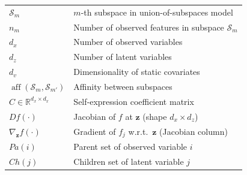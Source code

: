 \documentclass[11pt]{article}
\begin{document}
\begin{table}[htbp]
{\begin{tabular}{ll}
$\mathcal{S}_m$       & $m$-th subspace in union-of-subspaces model \\
$n_m$                 & Number of observed features in subspace $\mathcal{S}_m$ \\
$d_x$                 & Number of observed variables \\
$d_z$                 & Number of latent variables \\
$d_v$                 & Dimensionality of static covariates \\
$\operatorname{aff}(\mathcal{S}_m,\mathcal{S}_{m'})$ & Affinity between subspaces \\
$C \in \mathbb{R}^{d_x\times d_x}$ & Self‐expression coefficient matrix \\
$Df(\cdot)$           & Jacobian of $f$ at $\mathbf{z}$ (shape $d_x\times d_z$) \\
$\nabla_{\mathbf{z}} f(\cdot)$ & Gradient of $f_j$ w.r.t.\ $\mathbf{z}$ (Jacobian column) \\
$Pa(i)$               & Parent set of observed variable $i$ \\
$Ch(j)$               & Children set of latent variable $j$ \\
\bottomrule
\end{tabular}
}
\end{table}
\end{document}
